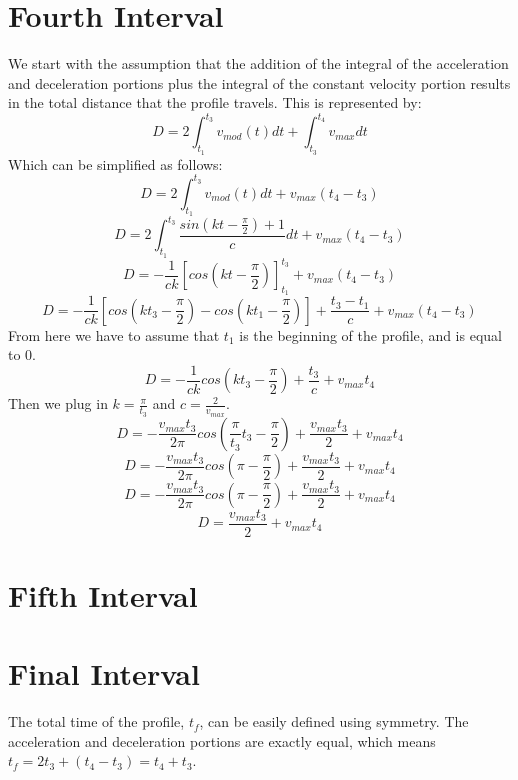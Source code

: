 \documentclass[a4paper,12pt]{report}
\newcommand{\tab}{\hspace{20pt}}
\begin{document}
	\section{Fourth Interval}
	\tab We start with the assumption that the addition of the integral of the acceleration and deceleration portions plus the integral of the constant velocity portion results in the total distance that the profile travels. This is represented by:
	\[D = 2\int_{t_1}^{t_3}v_{mod}(t)dt + \int_{t_3}^{t_4}v_{max}dt\]
	\tab Which can be simplified as follows:
	\[D = 2\int_{t_1}^{t_3}v_{mod}(t)dt + v_{max}(t_4 - t_3)\]
	\[D = 2\int_{t_1}^{t_3}\frac{sin(kt - \frac{\pi}{2}) + 1}{c}dt + v_{max}(t_4 - t_3)\]
	\[D = -\frac{1}{ck}\left[cos(kt - \frac{\pi}{2})\right]_{t_1}^{t_3} + v_{max}(t_4 - t_3)\]
	\[D = -\frac{1}{ck}\left[cos(kt_3 - \frac{\pi}{2}) - cos(kt_1 - \frac{\pi}{2})\right] + \frac{t_3 - t_1}{c} + v_{max}(t_4 - t_3)\]
	\tab From here we have to assume that $t_1$ is the beginning of the profile, and is equal to 0.
	\[D = -\frac{1}{ck}cos(kt_3 - \frac{\pi}{2}) + \frac{t_3}{c} + v_{max}t_4\]
	\tab Then we plug in $k = \frac{\pi}{t_3}$ and $c = \frac{2}{v_{max}}$.
	\[D = -\frac{v_{max}t_3}{2\pi}cos(\frac{\pi}{t_3}t_3 - \frac{\pi}{2}) + \frac{v_{max}t_3}{2} + v_{max}t_4\]
	\[D = -\frac{v_{max}t_3}{2\pi}cos(\pi - \frac{\pi}{2}) + \frac{v_{max}t_3}{2} + v_{max}t_4\]
	\[D = -\frac{v_{max}t_3}{2\pi}cos(\pi - \frac{\pi}{2}) + \frac{v_{max}t_3}{2} + v_{max}t_4\]
	\[D = \frac{v_{max}t_3}{2} + v_{max}t_4\]
	
	\section{Fifth Interval}
	\section{Final Interval}
	\tab The total time of the profile, $t_f$, can be easily defined using symmetry. The acceleration and deceleration portions are exactly equal, which means $t_f = 2t_3 + (t_4 - t_3) = t_4 + t_3$.
\end{document}
